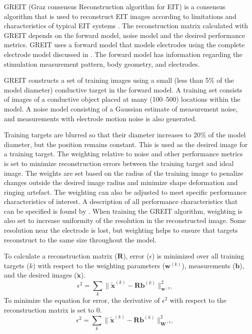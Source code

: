 GREIT (Graz consensus Reconstruction algorithm for EIT) is 
a consensus algorithm that is used to reconstruct EIT images 
according to limitations and characteristics of typical EIT systems 
\parencite{adler_greit_2009}. 
The reconstruction matrix calculated with GREIT depends on the
forward model, noise model and the desired performance metrics.
GREIT uses a forward model that models electrodes using 
the complete electrode model discussed in .
The forward model has information regarding the stimulation measurement pattern,
body geometry, and electrodes.

GREIT constructs a set of training images using a small (less than 5\% of the model diameter) 
conductive target in the 
forward model. A training set consists of images of a conductive object
placed at many (100--500) locations within the model. 
A noise model consisting of a Gaussian estimate of measurement noise, 
and measurements with electrode motion noise is also generated. 

Training targets are blurred so that their diameter increases to 20\% of 
the model diameter, but the position remains constant. 
This is used as the desired image for a training target. 
The weighting relative to noise and other performance metrics 
is set to minimize reconstruction errors between the training target and ideal image. 
The weights are set based on the radius of the training image to penalize
changes outside the desired image radius and minimize shape deformation
and ringing artefact. The weighting can also be adjusted to meet specific performance 
characteristics of interest. A description of all performance characteristics that 
can be specified is found by . 
When training the GREIT algorithm, weighting is also set to increase uniformity 
of the resolution in the reconstructed image. Some resolution near the electrode is 
lost, but weighting helps to ensure that targets reconstruct to the same size throughout the model.

To calculate a reconstruction matrix ($\mathbf{R}$), error ($\epsilon$)
is minimized over all training targets ($k$) with respect to the 
weighting parameters ($\mathbf{w}^{(k)}$),
measurements ($\mathbf{b}$), and the desired images ($\mathbf{\tilde{x}}$).
\begin{equation} \label{eq:greit_min}
	\epsilon^2 = \sum_{k} \|\mathbf{\tilde{x}}^{(k)}
    - \mathbf{Rb}^{(k)}\|^{2}_{\mathbf{w}^{(k)}}
\end{equation}
To minimize the equation for error, the derivative of $\epsilon^2$ with respect to the reconstruction 
matrix is set to 0.
\begin{equation} 
	\epsilon^2 = \sum_{k} \|\mathbf{\tilde{x}}^{(k)}
    - \mathbf{Rb}^{(k)}\|^{2}_{\mathbf{W}^{(k)}}
\end{equation}

